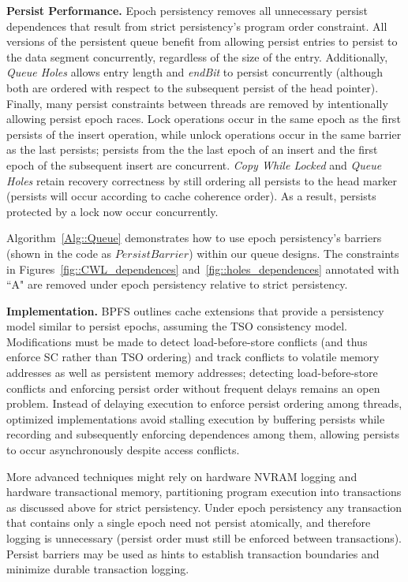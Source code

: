 \textbf{Persist Performance.}
Epoch persistency removes all unnecessary persist dependences that result from strict persistency's program order constraint.
All versions of the persistent queue benefit from allowing persist entries to persist to the data segment concurrently, regardless of the size of the entry.
Additionally, \emph{Queue Holes} allows entry length and \emph{endBit} to persist concurrently (although both are ordered with respect to the subsequent persist of the head pointer).
Finally, many persist constraints between threads are removed by intentionally allowing persist epoch races.
Lock operations occur in the same epoch as the first persists of the insert operation, while unlock operations occur in the same barrier as the last persists; persists from the the last epoch of an insert and the first epoch of the subsequent insert are concurrent.
\emph{Copy While Locked} and \emph{Queue Holes} retain recovery correctness by still ordering all persists to the head marker (persists will occur according to cache coherence order).
As a result, persists protected by a lock now occur concurrently.

Algorithm~\ref{Alg::Queue} demonstrates how to use epoch persistency's barriers (shown in the code as $PersistBarrier$) within our queue designs.
The constraints in Figures~\ref{fig::CWL_dependences} and~\ref{fig::holes_dependences} annotated with ``A" are removed under epoch persistency relative to strict persistency.

\textbf{Implementation.}
BPFS \cite{Condit09} outlines cache extensions that provide a persistency model similar to persist epochs, assuming the TSO consistency model.
Modifications must be made to detect load-before-store conflicts (and thus enforce SC rather than TSO ordering) and track conflicts to volatile memory addresses as well as persistent memory addresses; detecting load-before-store conflicts and enforcing persist order without frequent delays remains an open problem.
Instead of delaying execution to enforce persist ordering among threads, optimized implementations avoid stalling execution by buffering persists while recording and subsequently enforcing dependences among them, allowing persists to occur asynchronously despite access conflicts.

More advanced techniques might rely on hardware NVRAM logging and hardware transactional memory, partitioning program execution into transactions as discussed above for strict persistency.
Under epoch persistency any transaction that contains only a single epoch need not persist atomically, and therefore logging is unnecessary (persist order must still be enforced between transactions).
Persist barriers may be used as hints to establish transaction boundaries and minimize durable transaction logging.

